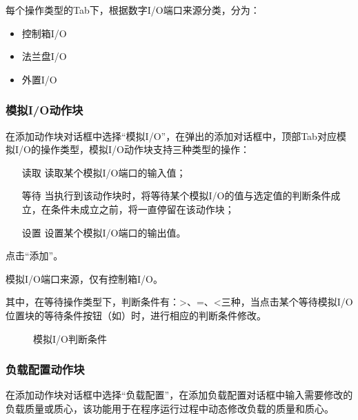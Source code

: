 每个操作类型的Tab下，根据数字I/O端口来源分类，分为：
\begin{itemize}
	\item 控制箱I/O
	\item 法兰盘I/O
	\item 外置I/O
\end{itemize}


\subsubsection{模拟I/O动作块}
在添加动作块对话框中选择“模拟I/O”，在弹出的添加对话框中，顶部Tab对应模拟I/O的操作类型，模拟I/O动作块支持三种类型的操作：
\begin{itemize}[font=\bfseries]
\item[读取] 读取某个模拟I/O端口的输入值；
\item[等待] 当执行到该动作块时，将等待某个模拟I/O的值与选定值的判断条件成立，在条件未成立之前，将一直停留在该动作块；
\item[设置] 设置某个模拟I/O端口的输出值。
\end{itemize}
点击“添加”。

模拟I/O端口来源，仅有控制箱I/O。

其中，在等待操作类型下，判断条件有：>、=、<三种，当点击某个等待模拟I/O位置块的等待条件按钮（如）时，进行相应的判断条件修改。

\begin{figure}[ht]
	\centering
	\color{red}{缺图}
	\caption{模拟I/O判断条件}
	\label{fig:模拟IO判断条件}
\end{figure}


\subsubsection{负载配置动作块}
在添加动作块对话框中选择“负载配置”，在添加负载配置对话框中输入需要修改的负载质量或质心，该功能用于在程序运行过程中动态修改负载的质量和质心。



